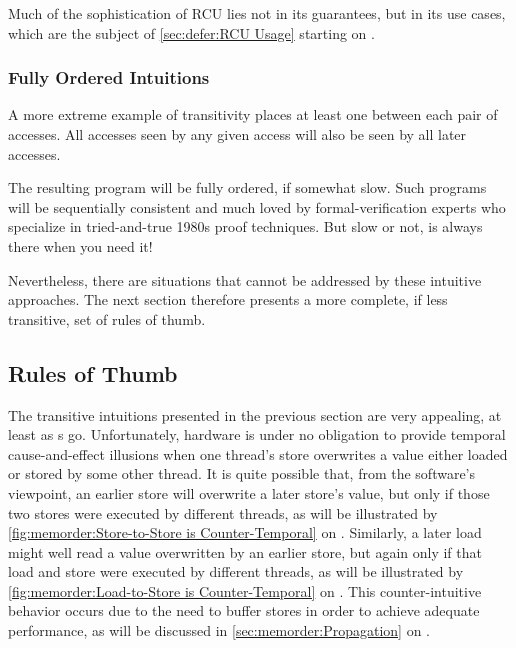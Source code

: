 Much of the sophistication of RCU lies not in its guarantees, but in its
use cases, which are the subject of
\cref{sec:defer:RCU Usage}
starting on
.

\subsubsection{Fully Ordered Intuitions}
\label{sec:memorder:Fully Ordered Intuitions}

A more extreme example of transitivity places at least one 
between each pair of accesses.
All accesses seen by any given access will also be seen by all later
accesses.

The resulting program will be fully ordered, if somewhat slow.
Such programs will be sequentially consistent and much loved by
formal-verification experts who specialize in tried-and-true 1980s
proof techniques.
But slow or not,  is always there when you need it!

Nevertheless, there are situations that cannot be addressed by these
intuitive approaches.
The next section therefore presents a more complete, if less transitive,
set of rules of thumb.

\subsection{Rules of Thumb}
\label{sec:memorder:Rules of Thumb}

The transitive intuitions presented in the previous section are
very appealing, at least as s go.
Unfortunately, hardware is under no obligation to provide temporal
cause-and-effect illusions when one thread's store overwrites a value either
loaded or stored by some other thread.
It is quite possible that, from the software's viewpoint, an earlier store
will overwrite a later store's value, but only if those two stores were
executed by different threads, as will be illustrated by
\cref{fig:memorder:Store-to-Store is Counter-Temporal}
on
.
Similarly, a later load might well read a value overwritten by an
earlier store, but again only if that load and store were executed by
different threads, as will be illustrated by
\cref{fig:memorder:Load-to-Store is Counter-Temporal}
on
.
This counter-intuitive behavior occurs due to the need to buffer
stores in order to achieve adequate performance, as will be discussed in
\cref{sec:memorder:Propagation}
on
.

